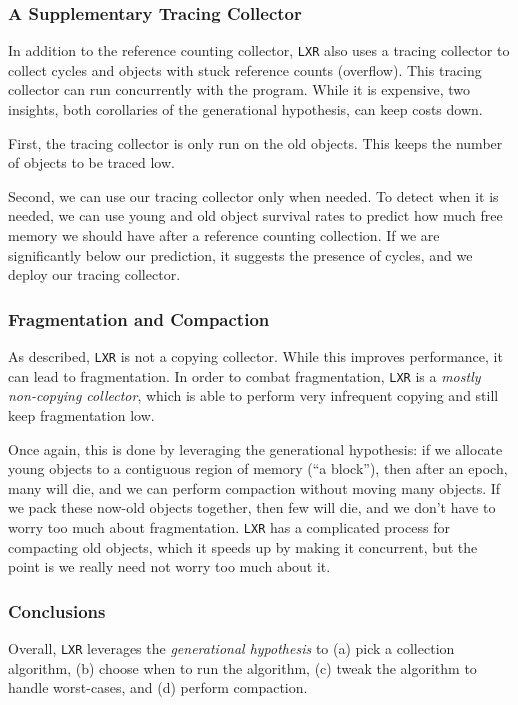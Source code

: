 \subsubsection{A Supplementary Tracing Collector}
In addition to the reference counting collector, \texttt{LXR} also uses a tracing collector to collect cycles and objects with stuck reference counts (overflow). This tracing collector can run concurrently with the program. While it is expensive, two insights, both corollaries of the generational hypothesis, can keep costs down.

First, the tracing collector is only run on the old objects. This keeps the number of objects to be traced low.

Second, we can use our tracing collector only when needed. To detect when it is needed, we can use young and old object survival rates to predict how much free memory we should have after a reference counting collection. If we are significantly below our prediction, it suggests the presence of cycles, and we deploy our tracing collector. 

\subsubsection{Fragmentation and Compaction}
As described, \texttt{LXR} is not a copying collector. While this improves performance, it can lead to fragmentation. In order to combat fragmentation, \texttt{LXR} is a \textit{mostly non-copying collector}, which is able to perform very infrequent copying and still keep fragmentation low. 

Once again, this is done by leveraging the generational hypothesis: if we allocate young objects to a contiguous region of memory (``a block''), then after an epoch, many will die, and we can perform compaction without moving many objects. If we pack these now-old objects together, then few will die, and we don't have to worry too much about fragmentation. \texttt{LXR} has a complicated process for compacting old objects, which it speeds up by making it concurrent, but the point is we really need not worry too much about it.

\subsubsection{Conclusions}
Overall, \texttt{LXR} leverages the \textit{generational hypothesis} to (a) pick a collection algorithm, (b) choose when to run the algorithm, (c) tweak the algorithm to handle worst-cases, and (d) perform compaction. 